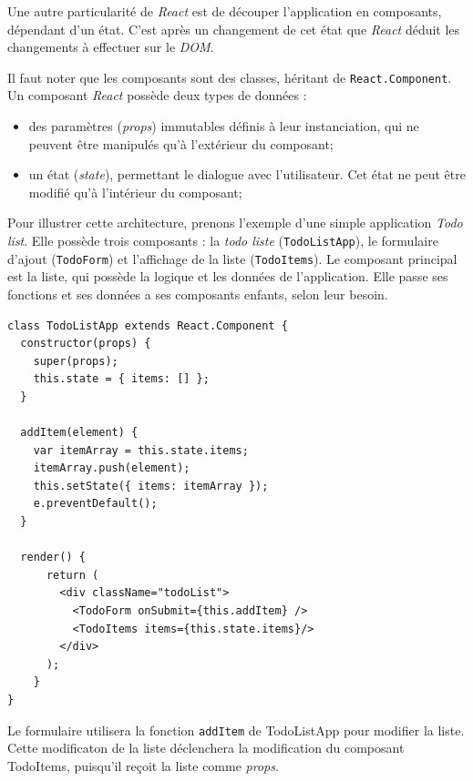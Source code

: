 \bigskip

Une autre particularité de \emph{React} est de découper l'application en
composants, dépendant d'un état. C'est après un changement de cet état
que \emph{React} déduit les changements à effectuer sur le \emph{DOM}.

\bigskip

Il faut noter que les composants sont des classes, héritant de
\texttt{React.Component}. Un composant \emph{React} possède deux types
de données :

\begin{itemize}
\tightlist
\item
  des paramètres (\emph{props}) immutables définis à leur instanciation,
  qui ne peuvent être manipulés qu'à l'extérieur du composant;
\item
  un état (\emph{state}), permettant le dialogue avec l'utilisateur. Cet
  état ne peut être modifié qu'à l'intérieur du composant;
\end{itemize}

\bigskip

Pour illustrer cette architecture, prenons l'exemple d'une simple
application \emph{Todo list}. Elle possède trois composants : la
\emph{todo liste} (\texttt{TodoListApp}), le formulaire d'ajout
(\texttt{TodoForm}) et l'affichage de la liste (\texttt{TodoItems}). Le
composant principal est la liste, qui possède la logique et les données
de l'application. Elle passe ses fonctions et ses données a ses
composants enfants, selon leur besoin.

\begin{verbatim}
class TodoListApp extends React.Component {
  constructor(props) {
    super(props);
    this.state = { items: [] };
  }

  addItem(element) {
    var itemArray = this.state.items;
    itemArray.push(element);
    this.setState({ items: itemArray });
    e.preventDefault();
  }

  render() {
      return (
        <div className="todoList">
          <TodoForm onSubmit={this.addItem} />
          <TodoItems items={this.state.items}/>
        </div>
      );
    }
}
\end{verbatim}

Le formulaire utilisera la fonction \texttt{addItem} de TodoListApp pour
modifier la liste. Cette modificaton de la liste déclenchera la
modification du composant TodoItems, puisqu'il reçoit la liste comme
\emph{props}.

\bigskip

